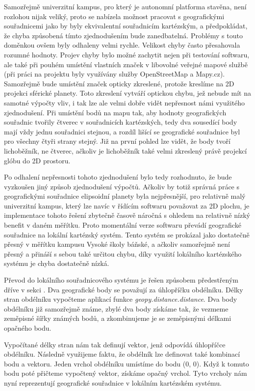 \documentclass[czech, bachelor]{diploma}
\begin{document}
Samozřejmě univerzitní kampus, pro který je autonomní platforma stavěna, není rozlohou nijak veliký, proto se nabízela možnost
pracovat s geografickými souřadnicemi jako by byly ekvivalentní souřadnicím kartézským, a předpokládat, že chyba způsobená tímto
zjednodušením bude zanedbatelná. Problémy s touto doměnkou ovšem byly odhaleny velmi rychle. Velikost chyby často přesahovala
rozumné hodnoty. Projev chyby bylo možné zachytit nejen při testování softwaru, ale také při pouhém umístění vlastních značek
v libovolné veřejné mapové službě (při práci na projektu byly využívány služby OpenStreetMap a Mapy.cz). Samozřejmě bude umístění
značek opticky zkreslené, protože kreslíme na 2D projekci sférické planety. Toto zkreslení vytváří optickou chybu, jež nebude mít
na samotné výpočty vliv, i tak lze ale velmi dobře vidět nepřesnost námi využitého zjednodušení. Při umístění bodů na mapu tak,
aby hodnoty geografických souřadnic tvořily čtverec v souřadnicích kartézských, tedy dva sousedící body mají vždy jednu souřadnici
stejnou, a rozdíl lišící se geografické souřadnice byl pro všechny čtyři strany stejný. Již na první pohled lze vidět, že body
tvoří lichoběžník, ne čtverec, ačkoliv je lichoběžník také velmi zkreslený právě projekcí glóbu do 2D prostoru.

Po odhalení nepřesnosti tohoto zjednodušení bylo tedy rozhodnuto, že bude vyzkoušen jiný způsob zjednodušení výpočtů.  Ačkoliv by
totiž správná práce s geografickými souřadnice elipsoidní planety byla nejpřesnější, pro relativně malý univerzitní kampus, který
lze navíc v řídícím softwaru považovat za 2D plochu, je implementace tohoto řešení zbytečně časově náročná s ohledem na relativně
nízký benefit v daném měřítku. Proto momentální verze softwaru převádí geografické souřadnice na lokální kartézský systém. Tento
systém se prokázal jako dostatečně přesný v měřítku kampusu Vysoké školy báňské, a ačkoliv samozřejmě není přesný a přináší
s sebou také určitou chybu, díky využití lokálního kartézského systému je chyba dostatečně nízká.

Převod do lokálního souřadnicového systému je řešen způsobem předestřeným dříve v sekci . Dva
geografické body se považují za úhlopříčku obdélníku. Délky stran obdélníku vypočteme aplikací funkce
\emph{geopy.distance.distance}. Dva body obdélníku již samozřejmě známe, zbylé dva body získáme tak, že vezmeme zeměpisné šířky
známých bodů, a zkombinujeme je se zeměpisnými délkami opačného bodu.

Vypočítané délky stran nám tak definují vektor, jenž odpovídá úhlopříčce obdélníku. Následně využijeme faktu, že obdélník lze
definovat také kombinací bodu a vektoru. Jeden vrchol obdélníku umístíme do bodu (0, 0). Když k tomuto bodu poté přičteme
vypočtený vektor, získáme opačný vrchol. Tyto vrcholy nám nyní reprezentují geografické souřadnice v lokálním kartézském systému.
\end{document}
